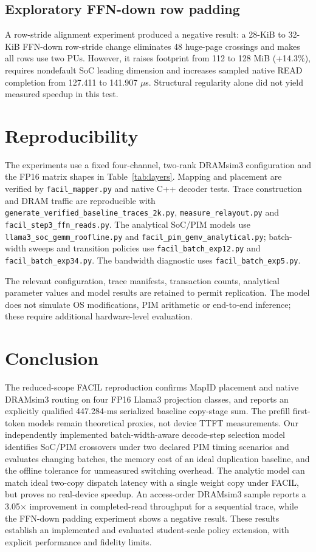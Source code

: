 \documentclass[conference,10pt]{IEEEtran}
\begin{document}
\subsection{Exploratory FFN-down row padding}
A row-stride alignment experiment produced a negative result:
a 28-KiB to 32-KiB FFN-down row-stride change eliminates 48
huge-page crossings and makes all rows use two PUs. However, it
raises footprint from 112 to 128 MiB (+14.3\%), requires
nondefault SoC leading dimension and increases sampled native
READ completion from 127.411 to 141.907 $\mu$s. Structural
regularity alone did not yield measured speedup in this test.

\section{Reproducibility}
The experiments use a fixed four-channel, two-rank DRAMsim3
configuration and the FP16 matrix shapes in Table~\ref{tab:layers}.
Mapping and placement are verified by \texttt{facil\_mapper.py}
and native C++ decoder tests. Trace construction and DRAM traffic
are reproducible with
\texttt{generate\_verified\_baseline\_traces\_2k.py},
\texttt{measure\_relayout.py} and
\texttt{facil\_step3\_ffn\_reads.py}. The analytical SoC/PIM
models use \texttt{llama3\_soc\_gemm\_roofline.py} and
\texttt{facil\_pim\_gemv\_analytical.py}; batch-width sweeps and
transition policies use \texttt{facil\_batch\_exp12.py} and
\texttt{facil\_batch\_exp34.py}. The bandwidth diagnostic uses
\texttt{facil\_batch\_exp5.py}.

The relevant configuration, trace manifests, transaction counts,
analytical parameter values and model results are retained to
permit replication. The model does not simulate OS modifications,
PIM arithmetic or end-to-end inference; these require additional
hardware-level evaluation.

\section{Conclusion}
The reduced-scope FACIL reproduction confirms MapID placement and
native DRAMsim3 routing on four FP16 Llama3 projection classes,
and reports an explicitly qualified 447.284-ms serialized baseline
copy-stage sum. The prefill first-token models remain theoretical
proxies, not device TTFT measurements. Our independently implemented
batch-width-aware decode-step selection model identifies SoC/PIM
crossovers under two declared PIM timing scenarios and evaluates
changing batches, the memory cost of an ideal duplication baseline,
and the offline tolerance for unmeasured switching overhead. The
analytic model can match ideal two-copy dispatch latency with a
single weight copy under FACIL, but proves no real-device speedup.
An access-order DRAMsim3 sample reports a 3.05$\times$ improvement
in completed-read throughput for a sequential trace, while the FFN-down padding experiment shows a negative result.
These results establish an implemented and evaluated student-scale
policy extension, with explicit performance and fidelity limits.
\end{document}
